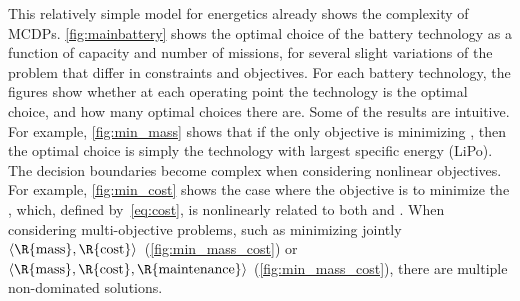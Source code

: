 This relatively simple model for energetics already shows the complexity
of MCDPs. \cref{fig:mainbattery} shows the optimal choice of the battery
technology as a function of capacity and number of missions, for several
slight variations of the problem that differ in constraints and objectives.
For each battery technology, the figures show whether at each operating
point the technology is the optimal choice, and how many optimal choices
there are. Some of the results are intuitive. For example, \cref{fig:min_mass}
shows that if the only objective is minimizing , then the
optimal choice is simply the technology with largest specific energy
(LiPo). The decision boundaries become complex when considering nonlinear
objectives. For example, \cref{fig:min_cost} shows the case where the
objective is to minimize the , which, defined by~\cref{eq:cost},
is nonlinearly related to both  and .
When considering multi-objective problems, such as minimizing jointly
$\left\langle \R{\text{mass}},\R{\text{cost}}\right\rangle $~(\cref{fig:min_mass_cost})
or~$\left\langle \R{\text{mass}},\R{\text{cost}},\R{\text{maintenance}}\right\rangle $
(\cref{fig:min_mass_cost}), there are multiple non-dominated solutions.

